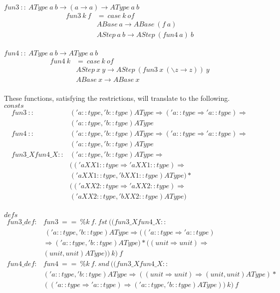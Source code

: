 \documentclass{llncs}
\begin{document}
\noindent $ fun3 \ :: \ AType \ a \ b \to (a \to a) \to AType \ a \ b $
$$\begin{array}{ll}
fun3 \ k \ f & = \ case \ k \ of \\
  & ABase \ a \to ABase \ (f \ a) \\
  & AStep \ a \ b \to AStep \ (fun4 \ a) \ b \\
\end{array}$$
   
\noindent $ fun4 \ :: \ AType \ a \ b \to AType \ a \ b $
$$\begin{array}{ll}
fun4 \ k & = \ case \ k \ of \\ 
  & AStep \ x \ y \to AStep \ (fun3 \ x \ (\backslash z \to z)) \ y \\
   & ABase \ x \to ABase \ x \\
\end{array}$$

\noindent These functions, satisfying the restrictions, will translate
to the following.\\

\noindent $consts$
$$\begin{array}{ll}
fun3 \ :: & ('a::type, 'b::type) AType \Rightarrow ('a::type \Rightarrow 'a::type) \Rightarrow \\ & ('a::type, 'b::type) AType \\
fun4 \ :: & ('a::type, 'b::type) AType \Rightarrow ('a::type \Rightarrow 'a::type) \Rightarrow\\ & ('a::type, 'b::type) AType \\
fun3\_Xfun4\_X :: & ('a::type, 'b::type) AType \Rightarrow \\ & (('aXX1::type \Rightarrow 'aXX1::type) \Rightarrow \\ & ('aXX1::type, 'bXX1::type) AType) * \\
 & (('aXX2::type \Rightarrow 'aXX2::type) \Rightarrow \\ & ('aXX2::type, 'bXX2::type) AType) \\
\end{array}$$

\noindent $defs$
$$\begin{array}{lll}
fun3\_def : & fun3 \ == \ \% k \ f. \ fst \ (( fun3\_Xfun4\_X ::  \\ 
        & \ ('a::type, 'b::type) AType \Rightarrow (('a::type \Rightarrow 'a::type) \\
& \Rightarrow ('a::type, 'b::type) AType) * ((unit \Rightarrow unit) \Rightarrow \\ & (unit, unit) AType) ) \ k) \ f \\
fun4\_def : & fun4 \ == \ \% k \ f. \ snd \ (( fun3\_Xfun4\_X ::  \\ 
 & ('a::type, 'b::type) AType \Rightarrow ((unit \Rightarrow unit) \Rightarrow (unit, unit) AType) * \\ & (('a::type \Rightarrow 'a::type) \Rightarrow ('a::type, 'b::type) AType) ) \ k) \ f \\
\end{array}$$
\end{document}
